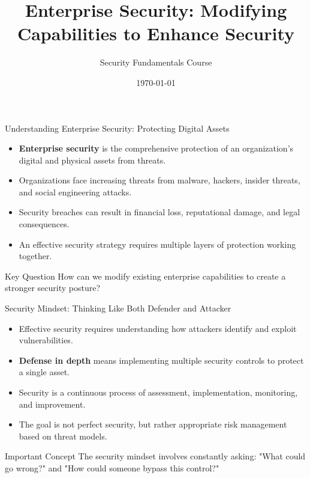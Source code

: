 \documentclass{beamer}
\title{Enterprise Security: Modifying Capabilities to Enhance Security}
\author{Security Fundamentals Course}
\date{\today}
\begin{document}
\begin{frame}
\titlepage
\end{frame}

\begin{frame}{Understanding Enterprise Security: Protecting Digital Assets}
\begin{itemize}
    \item \textbf{Enterprise security} is the comprehensive protection of an organization's digital and physical assets from threats.
    \item Organizations face increasing threats from malware, hackers, insider threats, and social engineering attacks.
    \item Security breaches can result in financial loss, reputational damage, and legal consequences.
    \item An effective security strategy requires multiple layers of protection working together.
\end{itemize}

\begin{block}{Key Question}
How can we modify existing enterprise capabilities to create a stronger security posture?
\end{block}
\end{frame}

\begin{frame}{Security Mindset: Thinking Like Both Defender and Attacker}
\begin{itemize}
    \item Effective security requires understanding how attackers identify and exploit vulnerabilities.
    \item \textbf{Defense in depth} means implementing multiple security controls to protect a single asset.
    \item Security is a continuous process of assessment, implementation, monitoring, and improvement.
    \item The goal is not perfect security, but rather appropriate risk management based on threat models.
\end{itemize}

\begin{alertblock}{Important Concept}
The security mindset involves constantly asking: "What could go wrong?" and "How could someone bypass this control?"
\end{alertblock}
\end{frame}
\end{document}
